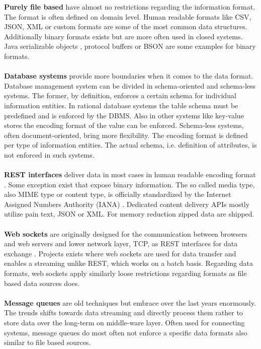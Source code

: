 \noindent\textbf{Purely file based} have almost no restrictions regarding the information format. The format is often defined on domain level. Human readable formats like CSV, JSON, XML or custom formats are some of the most common data structures. Additionally binary formats exists but are more often used in closed systems. Java serializable objects
, protocol buffers
or BSON 
are some examples for binary formats.
\\\\
\textbf{Database systems} provide more boundaries when it comes to the data format. Database management system can be divided in schema-oriented and schema-less systems. The former, by definition, enforces a certain schema for individual information entities. In rational database systems the table schema must be predefined and is enforced by the DBMS. Also in other systems like key-value stores the encoding format of the value can be enforced. Schema-less systems, often document-oriented, bring more flexibility. The encoding format is defined per type of information entities. The actual schema, i.e. definition of attributes, is not enforced in such systems.
\\\\
\textbf{REST interfaces} deliver data in most cases in human readable encoding format
. Some exception exist that expose binary information. The so called media type, also MIME type or content type, is officially standardized by the Internet Assigned Numbers Authority (IANA)
. Dedicated content delivery APIs mostly utilize pain text, JSON or XML. For memory reduction zipped data are shipped. 
\\\\
\textbf{Web sockets} are originally designed for the communication between browsers and web servers and lower network layer, TCP, as REST interfaces for data exchange
. Projects exists where web sockets are used for data transfer and enables a streaming unlike REST, which works on a batch basis. Regarding data formats, web sockets apply similarly loose restrictions regarding formats as file based data sources does.
\\\\
\textbf{Message queues} are old techniques but embrace over the last years enormously. The trends shifts towards data streaming and directly process them rather to store data over the long-term on middle-ware layer. Often used for connecting systems, message queues do most often not enforce a specific data formats also similar to file based sources.

